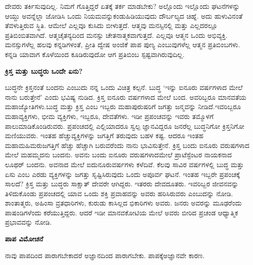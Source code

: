 ದೇವರು ತರ್ಕಿಸುವುದಿಲ್ಲ. ನಿಮಗೆ ಗೊತ್ತಿದ್ದರೆ ಏತಕ್ಕೆ ತರ್ಕ ಮಾಡಬೇಕು? ಅಲ್ಲೊಂದು ಇಲ್ಲೊಂದು ಘಟನೆಗಳನ್ನು ಆಯ್ದು ಅವನ್ನೆಲ್ಲಾ ಜೋಡಿಸಿ ಒಂದು ನಿಯಮವನ್ನು\break ಕಂಡುಹಿಡಿಯುವುದು ದೌರ್ಬಲ್ಯದ ಚಿಹ್ನೆ. ಅದು ಹುಳುವಿನಂತೆ ತೆವಳುತ್ತಿರುವ ಸ್ಥಿತಿ. ಆಮೇಲೆ ಎಲ್ಲವೂ ಕುಸಿದು ಬೀಳುತ್ತದೆ. ಆತ್ಮವು ಮನಸ್ಸಿನಲ್ಲಿ ಮತ್ತು ಎಲ್ಲದರಲ್ಲೂ ಪ್ರತಿಬಿಂಬಿತವಾಗಿದೆ. ಆತ್ಮಚೈತನ್ಯದಿಂದ ಮನಸ್ಸು ಚೇತನಾತ್ಮಕವಾಗುತ್ತದೆ. ಎಲ್ಲವೂ ಆತ್ಮನ ಒಂದು ಅಭಿವ್ಯಕ್ತಿ. ಮನಸ್ಸುಗಳೆಲ್ಲ ಹಲವು ಕನ್ನಡಿಗಳಂತೆ, ಪ್ರೀತಿ ದ್ವೇಷ ಅಂಜಿಕೆ ಪಾಪ ಪುಣ್ಯ ಎಂಬುವುಗಳೆಲ್ಲ ಆತ್ಮನ ಪ್ರತಿಬಿಂಬಗಳು. ಕನ್ನಡಿ ಯಾವಾಗ ಕೊಳೆಯಿಂದ ಕೂಡಿರುವುದೋ ಆಗ ಪ್ರತಿಬಿಂಬ ಸ್ಪಷ್ಟವಾಗಿರುವುದಿಲ್ಲ.

\begin{center}
\textbf{ಕ್ರಿಸ್ತ ಮತ್ತು ಬುದ್ಧರು ಒಂದೇ ಏನು?}
\end{center}

ಬುದ್ಧನೇ ಕ್ರಿಸ್ತನಂತೆ ಬಂದನು ಎಂಬುದು ನನ್ನ ಒಂದು ವಿಚಿತ್ರ ಕಲ್ಪನೆ. ಬುದ್ಧ ‘ಇನ್ನು ಐನೂರು ವರ್ಷಗಳಾದ ಮೇಲೆ ನಾನು ಬರುತ್ತೇನೆ’ ಎಂದು ಭವಿಷ್ಯ ನುಡಿದ. ಕ್ರಿಸ್ತ ಐನೂರು ವರ್ಷಗಳಾದ ಮೇಲೆ ಬಂದ. ಅವರಿಬ್ಬರೂ ಮಾನವತೆಯ ಮಹಾಜ್ಯೋತಿಗಳು.\break ಬುದ್ಧ ಮತ್ತು ಕ್ರಿಸ್ತ ಎಂಬ ಇಬ್ಬರು ಮಹಾಪುರುಷರಿಗೆ ಜಗತ್ತು ಜನ್ಮವನ್ನು ನೀಡಿದೆ.\break ಇವರಿಬ್ಬರೂ ಮಹಾವ್ಯಕ್ತಿಗಳು, ಭೀಮ ವ್ಯಕ್ತಿಗಳು, ಇಬ್ಬರೂ, ದೇವತೆಗಳು. ಇಡೀ ಪ್ರಪಂಚವನ್ನು ಇವರು ತಮ್ಮೊಳಗೆ ಪಾಲುಮಾಡಿಕೊಂಡಿರುವರು. ಪ್ರಪಂಚದಲ್ಲಿ ಎಲ್ಲಿಯಾದರೂ ಸ್ವಲ್ಪ ಜ್ಞಾನವಿದ್ದರೂ ಜನರೆಲ್ಲ ಬುದ್ಧನಿಗೋ ಕ್ರಿಸ್ತನಿಗೋ ಮಣಿಯುವರು. ಇಂತಹ ಹೆಚ್ಚು\break ವ್ಯಕ್ತಿಗಳನ್ನು ಜಗತ್ತಿಗೆ ತರುವುದು ಬಹಳ ಕಷ್ಟ. ಆದರೂ ಇಂತಹ ಮಹಾಮಹಿಮರು\break ಜಗತ್ತಿಗೆ ಹೆಚ್ಚು ಹೆಚ್ಚಾಗಿ ಬರುವರೆಂದು ನಾನು ಭಾವಿಸುತ್ತೇನೆ. ಕ್ರಿಸ್ತ ಬಂದು ಐನೂರು ವರುಷಗಳಾದ ಮೇಲೆ ಮಹಮ್ಮದನು ಬಂದನು. ಅವನು ಬಂದು ಐನೂರು ವರುಷಗಳಾದ\break ಮೇಲೆ ಪ್ರಾಟೆಸ್ಟೆಂಟರ ನಾಯಕನಾದ ಲೂಥರ್​ ಬಂದನು. ಅವನಾದ ಮೇಲೆ ಐದುನೂರು\break ವರ್ಷಗಳು ಕಳೆದಿವೆ. ಕೆಲವು ಸಾವಿರ ವರ್ಷಗಳಲ್ಲಿ ಬುದ್ಧ ಮತ್ತು ಏಸು ಎಂಬ ಎರಡು ವ್ಯಕ್ತಿಗಳನ್ನು ಜಗತ್ತು ಸೃಷ್ಟಿಸಿರುವುದು ಒಂದು ಅಪೂರ್ವ ಘಟನೆ. ಇಂತಹ ಇಬ್ಬರೇ ಪ್ರಪಂಚಕ್ಕೆ ಸಾಲದೆ? ಕ್ರಿಸ್ತ ಮತ್ತು ಬುದ್ಧರು ಸಾಕ್ಷಾತ್​ ದೇವರೇ ಆಗಿದ್ದರು. ಇತರರು ದೇವದೂತರು. ಇವರಿಬ್ಬರ ಜೀವನವನ್ನು ತಿಳಿದುಕೊಂಡು ಪ್ರಪಂಚದಲ್ಲಿ ಯಾವ ಒಂದು ಶಕ್ತಿ ಪ್ರವಾಹವನ್ನು ಅವರು ಹರಿಸಿರುವರು ಎಂಬುದನ್ನು ನೋಡಿ. ಶಾಂತಾತ್ಮರು, ಅಹಿಂಸಾ ವ್ರತಧಾರಿಗಳು, ಕುರುಡು ಕಾಸಿಲ್ಲದ ಭಿಕಾರಿಗಳು ಅವರು. ಜನರು ಅವರನ್ನು ಮೂಢರೆಂದು ಪಾಷಂಡಿಗಳೆಂದು ಕರೆಯುತ್ತಿದ್ದರು. ಆದರೆ ಇಡೀ ಮಾನವಕೋಟಿಯ ಮೇಲೆ ಅವರು ಬೀರಿದ ಪ್ರಚಂಡ ಆಧ್ಯಾತ್ಮಿಕ ಪ್ರಭಾವವನ್ನು ನೋಡಿ.

\vspace{-0.3cm}

\begin{center}
\textbf{ಪಾಪ ವಿಮೋಚನೆ}
\end{center}

\vspace{-0.3cm}

ನಾವು ಪಾಪದಿಂದ ಪಾರಾಗಬೇಕಾದರೆ ಅಜ್ಞಾನದಿಂದ ಪಾರಾಗಬೇಕು. ಪಾಪಕ್ಕೆ\break ಅಜ್ಞಾನವೇ ಕಾರಣ.

\vspace{-0.3cm}

